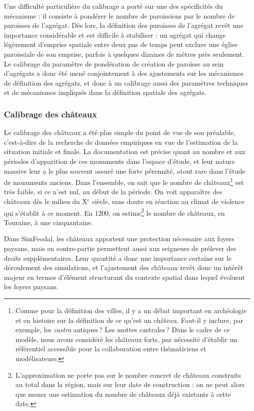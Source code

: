 Une difficulté particulière du calibrage a porté sur une des spécificités du mécanisme : il consiste à pondérer le nombre de paroissiens par le nombre de paroisses de l'agrégat.
Dès lors, la définition des \og paroisses de l'agrégat\fg{} revêt une importance considérable et est difficile à stabiliser : un agrégat qui change légèrement d'emprise spatiale entre deux pas de temps peut \og exclure\fg{} une église paroissiale de son emprise, parfois à quelques dizaines de mètres près seulement.
Le calibrage du paramètre de pondération de création de paroisse au sein d'agrégats a donc été mené conjointement à des ajustements sur les mécanismes de définition des agrégats, et donc à un calibrage aussi des paramètres techniques et de mécanismes impliqués dans la définition spatiale des agrégats.

\subsubsection{Calibrage des châteaux \label{subsubsec:calibrage-chateaux}}

Le calibrage des châteaux a été plus simple du point de vue de son préalable, c'est-à-dire de la recherche de données empiriques en vue de l'estimation de la situation initiale et finale.
La documentation est précise quant au nombre et aux périodes d'apparition de ces monuments dans l'espace d'étude, et leur nature massive leur a le plus souvent assuré une forte pérennité, atout rare dans l'étude de monuments anciens.
Dans l'ensemble, on sait que le nombre de châteaux\footnote{
	Comme pour la définition des villes, il y a un débat important en archéologie et en histoire sur la définition de ce qu'est un château.
	Faut-il y inclure, par exemple, les \textit{castra} antiques ? Les mottes castrales ?
	Dans le cadre de ce modèle, nous avons considéré les \og châteaux forts\fg{}, par nécessité d'établir un référentiel accessible pour la collaboration entre thématiciens et modélisateurs.
} est très faible, si ce n'est nul, au début de la période.
On voit apparaître des châteaux dès le milieu du X$^e$ siècle, sans doute en réaction au climat de violence qui s'établit à ce moment.
En 1200, on estime\footnote{
	L'approximation ne porte pas sur le nombre concret de châteaux construits au total dans la région, mais sur leur date de construction : on ne peut alors que mener une estimation du nombre de châteaux déjà existants à cette date.
} le nombre de châteaux, en Touraine, à une cinquantaine.

Dans SimFeodal, les châteaux apportent une protection nécessaire aux foyers paysans, mais en contre-partie permettent aussi aux seigneurs de prélever des droits supplémentaires.
Leur quantité a donc une importance certaine sur le déroulement des simulations, et l'ajustement des châteaux revêt donc un intérêt majeur en termes d'élément structurant du contexte spatial dans lequel évoluent les foyers paysans.

